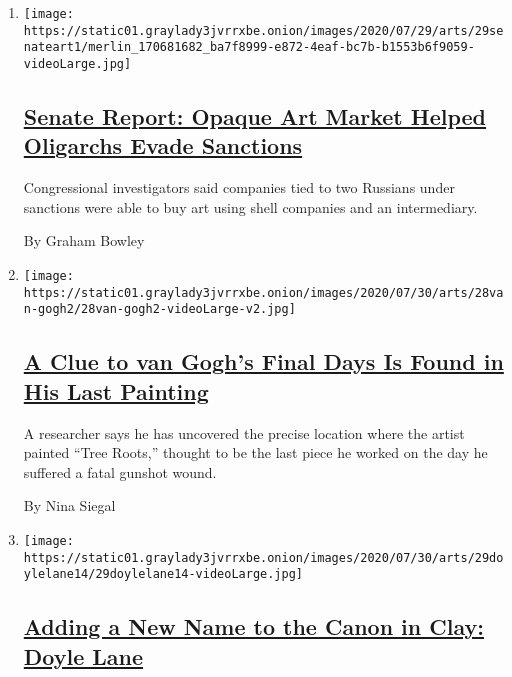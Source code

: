 \begin{enumerate}
\def\labelenumi{\arabic{enumi}.}
\item
  \texttt{[image: https://static01.graylady3jvrrxbe.onion/images/2020/07/29/arts/29senateart1/merlin\_170681682\_ba7f8999-e872-4eaf-bc7b-b1553b6f9059-videoLarge.jpg]}

  \hypertarget{senate-report-opaque-art-market-helped-oligarchs-evade-sanctions}{%
  \subsection{\texorpdfstring{\href{/2020/07/29/arts/design/senate-report-art-market-russia-oligarchs-sanctions.html}{Senate
  Report: Opaque Art Market Helped Oligarchs Evade
  Sanctions}}{Senate Report: Opaque Art Market Helped Oligarchs Evade Sanctions}}\label{senate-report-opaque-art-market-helped-oligarchs-evade-sanctions}}

  Congressional investigators said companies tied to two Russians under
  sanctions were able to buy art using shell companies and an
  intermediary.

  By Graham Bowley
\item
  \texttt{[image: https://static01.graylady3jvrrxbe.onion/images/2020/07/30/arts/28van-gogh2/28van-gogh2-videoLarge-v2.jpg]}

  \hypertarget{a-clue-to-van-goghs-final-days-is-found-in-his-last-painting}{%
  \subsection{\texorpdfstring{\href{/2020/07/28/arts/design/vincent-van-gogh-tree-roots.html}{A
  Clue to van Gogh's Final Days Is Found in His Last
  Painting}}{A Clue to van Gogh's Final Days Is Found in His Last Painting}}\label{a-clue-to-van-goghs-final-days-is-found-in-his-last-painting}}

  A researcher says he has uncovered the precise location where the
  artist painted ``Tree Roots,'' thought to be the last piece he worked
  on the day he suffered a fatal gunshot wound.

  By Nina Siegal
\item
  \texttt{[image: https://static01.graylady3jvrrxbe.onion/images/2020/07/30/arts/29doylelane14/29doylelane14-videoLarge.jpg]}

  \hypertarget{adding-a-new-name-to-the-canon-in-clay-doyle-lane}{%
  \subsection{\texorpdfstring{\href{/2020/07/29/arts/design/doyle-lane-ceramics.html}{Adding
  a New Name to the Canon in Clay: Doyle
  Lane}}{Adding a New Name to the Canon in Clay: Doyle Lane}}\label{adding-a-new-name-to-the-canon-in-clay-doyle-lane}}


\end{enumerate}
